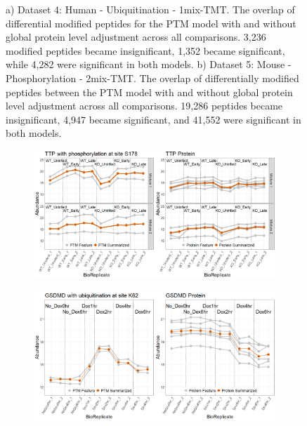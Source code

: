 \documentclass[mcp]{article}
\numberwithin{table}{section}
\begin{document}
\begin{figure}[ht]
\begin{subfigure}[c]{0.55\linewidth}
\caption{}
\label{fig:data5_venn_diagram}
\end{subfigure}
\caption{
a) Dataset 4: Human - Ubiquitination - 1mix-TMT. The overlap of differential modified peptides for the PTM model with and without global protein level adjustment across all comparisons.  3,236 modified peptides became insignificant, 1,352 became significant, while 4,282 were significant in both models. b) Dataset 5: Mouse - Phosphorylation - 2mix-TMT. The overlap of differentially modified peptides between the PTM model with and without global protein level adjustment across all comparisons. 19,286 peptides became insignificant, 4,947 became significant, and 41,552 were significant in both models. }
\label{fig:venn_diagrams}
\end{figure}

\begin{figure}[h!]
\centering
\begin{subfigure}{\textwidth}
 \centering
\includegraphics[width=1.0\textwidth]{images/No_Difference_Shigella_Profile_Plot}
\caption{}
\label{fig:data4_profile_plot}
 \end{subfigure}
 \begin{subfigure}{\textwidth}
 \centering
	\includegraphics[width=1.0\textwidth]{images/IpaH_prof_plot.png}

\end{subfigure}
\end{figure}
\end{document}
